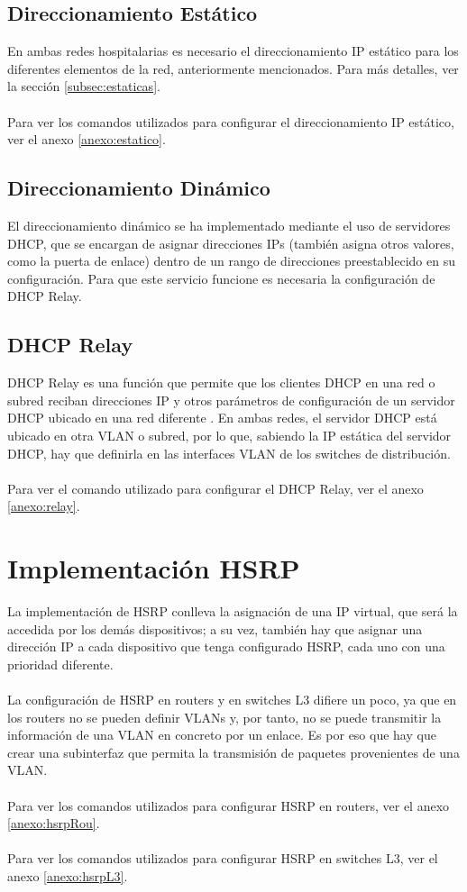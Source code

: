\subsection{Direccionamiento Estático}
En ambas redes hospitalarias es necesario el direccionamiento IP estático para los diferentes elementos de la red, anteriormente mencionados. Para más detalles, ver la sección \ref{subsec:estaticas}.
\\ \\
Para ver los comandos utilizados para configurar el direccionamiento IP estático, ver el anexo \ref{anexo:estatico}.
\subsection{Direccionamiento Dinámico}
El direccionamiento dinámico se ha implementado mediante el uso de servidores DHCP, que se encargan de asignar direcciones IPs (también asigna otros valores, como la puerta de enlace) dentro de un rango de direcciones preestablecido en su configuración. Para que este servicio funcione es necesaria la configuración de DHCP Relay.

\subsection{DHCP Relay}
DHCP Relay es una función que permite que los clientes DHCP en una red o subred reciban direcciones IP y otros parámetros de configuración de un servidor DHCP ubicado en una red diferente \cite{cisco_dhcp_relay}. En ambas redes, el servidor DHCP está ubicado en otra VLAN o subred, por lo que, sabiendo la IP estática del servidor DHCP, hay que definirla en las interfaces VLAN de los switches de distribución. 
\\ \\
Para ver el comando utilizado para configurar el DHCP Relay, ver el anexo \ref{anexo:relay}.

\section{Implementación HSRP}
La implementación de HSRP conlleva la asignación de una IP virtual, que será la accedida por los demás dispositivos; a su vez, también hay que asignar una dirección IP a cada dispositivo que tenga configurado HSRP, cada uno con una prioridad diferente.
\\ \\
La configuración de HSRP en routers y en switches L3 difiere un poco, ya que en los routers no se pueden definir VLANs y, por tanto, no se puede transmitir la información de una VLAN en concreto por un enlace. Es por eso que hay que crear una subinterfaz que permita la transmisión de paquetes provenientes de una VLAN.
\\ \\
Para ver los comandos utilizados para configurar HSRP en routers, ver el anexo \ref{anexo:hsrpRou}.
\\ \\
Para ver los comandos utilizados para configurar HSRP en switches L3, ver el anexo \ref{anexo:hsrpL3}.




